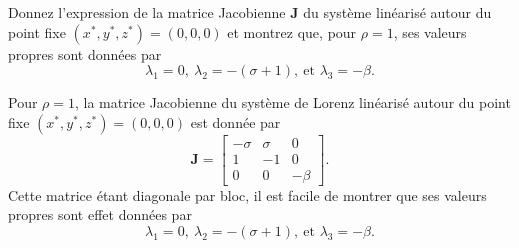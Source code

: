 \documentclass[12pt, answers]{exam}
\begin{document}
\begin{questions}
\begin{parts}
    \begin{subparts}
      \subpart[1] Donnez l'expression de la matrice Jacobienne $\bm{J}$ du système linéarisé autour du point fixe $(x^*, y^*, z^*) = (0, 0, 0)$ et montrez que, pour $\rho = 1$, ses valeurs propres sont données par
      $$
      \lambda_1 = 0, \ \lambda_2 = -(\sigma + 1), \ \text{et } \lambda_3 = -\beta.
      $$

      \begin{solution}
        {\color{blue}
        Pour $\rho = 1$, la matrice Jacobienne du système de Lorenz linéarisé autour du point fixe $(x^*, y^*, z^*) = (0, 0, 0)$ est donnée par
        $$
        \bm{J} = \begin{bmatrix}
                  -\sigma & \sigma & 0 \\
                  1 & -1 & 0 \\
                  0 & 0 & -\beta
                \end{bmatrix}.
        $$
        Cette matrice étant diagonale par bloc, il est facile de montrer que ses valeurs propres sont effet données par
        $$
        \lambda_1 = 0, \ \lambda_2 = -(\sigma + 1), \ \text{et } \lambda_3 = -\beta.
        $$
        }
      \end{solution}


\end{subparts}
\end{parts}
\end{questions}
\end{document}
